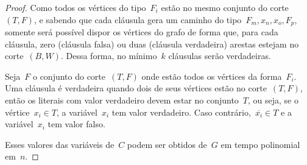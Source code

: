 \begin{proof}

		Como todos os vértices do tipo~$F_i$ estão no mesmo conjunto
		do corte~$(T,F)$, e sabendo que cada cláusula gera um 
		caminho do tipo~$F_m,x_n,x_o,F_p$, somente será possível
		dispor os vértices do grafo de forma que, para cada cláusula,
		zero (cláusula falsa) ou duas (cláusula verdadeira) arestas 
		estejam no corte~$(B,W)$.
		Dessa forma, no mínimo~$k$ cláusulas serão verdadeiras. 

		Seja~$F$ o conjunto do corte~$(T,F)$ onde estão todos os vértices
		da forma~$F_i$.
		Uma cláusula é verdadeira quando dois de seus vértices
		estão no corte~$(T,F)$, então os literais com valor verdadeiro
		devem estar no conjunto~$T$,
		ou seja, 
		se o vértice~$x_i\in T$, a variável~$x_i$ tem valor verdadeiro.
		Caso contrário,~$\overline{x_i}\in T$ e a variável~$x_i$ tem valor falso.
		
		Esses valores das variáveis de~$C$ podem ser obtidos de~$G$ em
		tempo polinomial em~$n$.
	\end{proof}








